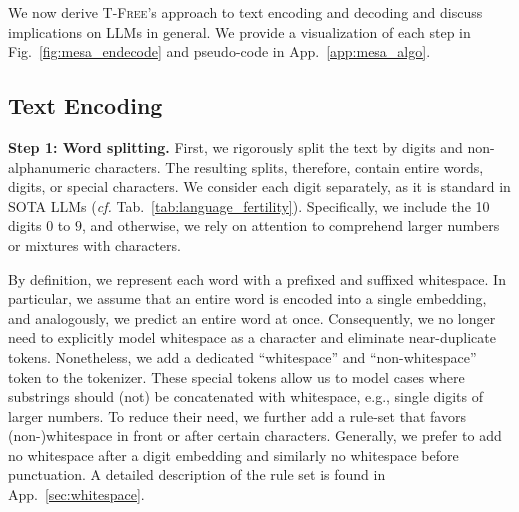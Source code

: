 \documentclass[11pt]{article}
\newcommand\todo[1]{\textcolor{red}{#1}}
\newcommand{\ps}[1]{\textcolor{purple}{PS: #1}}
\newcommand{\mb}[1]{\textcolor{blue}{MB: #1}}
\newcommand{\bd}[1]{\textcolor{pink}{BD: #1}}
\newcommand{\method}{\textsc{T-Free}}
\begin{document}
We now derive \method's approach to text encoding and decoding and discuss implications on LLMs in general. We provide a visualization of each step in Fig.~\ref{fig:mesa_endecode} and pseudo-code in App.~\ref{app:mesa_algo}.

%



\subsection{Text Encoding}
\label{sec:encoding}
\textbf{Step 1: Word splitting.} First, we rigorously split the text by digits and non-alphanumeric characters. The resulting splits, therefore, contain entire words, digits, or special characters.
We consider each digit separately, as it is standard in SOTA LLMs (\emph{cf.} Tab.~\ref{tab:language_fertility}). Specifically, we include the 10 digits $0$ to $9$, and otherwise, we rely on attention to comprehend larger numbers or mixtures with characters.

By definition, we represent each word with a prefixed and suffixed whitespace. In particular, we assume that an entire word is encoded into a single embedding, and analogously, we predict an entire word at once.
Consequently, we no longer need to explicitly model whitespace as a character and eliminate near-duplicate tokens. 
Nonetheless, we add a dedicated ``whitespace'' and ``non-whitespace'' token to the tokenizer. These special tokens allow us to model cases where substrings should (not) be concatenated with whitespace, e.g., single digits of larger numbers. 
%
To reduce their need, we further add a rule-set that favors \mbox{(non-)}whitespace in front or after certain characters. Generally, we prefer to add no whitespace after a digit embedding and similarly no whitespace before punctuation.  
A detailed description of the rule set is found in App.~\ref{sec:whitespace}.
\end{document}
